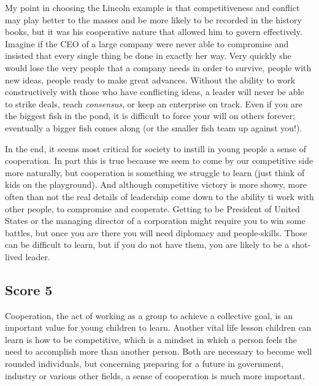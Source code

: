 My point in choosing the Lincoln example is that competitiveness and conflict may play better to the masses and be more likely to be recorded in the history books, but it was his cooperative nature that allowed him to govern effectively.
Imagine if the CEO of a large company were never able to compromise and insisted that every single thing be done in exactly her way.
Very quickly she would lose the very people that a company needs in order to survive, people with new ideas, people ready to make great advances.
Without the ability to work constructively with those who have conflicting ideas, a leader will never be able to strike deals, reach \emph{consensus}, or keep an enterprise on track.
Even if you are the biggest fish in the pond, it is difficult to force your will on others forever; eventually a bigger fish comes along (or the smaller fish team up against you!).

In the end, it seems most critical for society to instill in young people a sense of cooperation.
In part this is true because we seem to come by our competitive side more naturally, but cooperation is something we struggle to learn (just think of kids on the playground).
And although competitive victory is more showy, more often than not the real details of leadership come down to the ability ti work with other people, to compromise and cooperate.
Getting to be President of United States or the managing director of a corporation might require you to win some battles, but once you are there you will need diplomacy and people-skills.
Those can be difficult to learn, but if you do not have them, you are likely to be a shot-lived leader.


\subsection{Score 5}
Cooperation, the act of working as a group to achieve a collective goal, is an important value for young children to learn.
Another vital life lesson children can learn is how to be competitive, which is a mindset in which a person feels the need to accomplish more than another person.
Both are necessary to become well rounded individuals, but concerning preparing for a future in government, industry or various other fields, a sense of cooperation is much more important.

